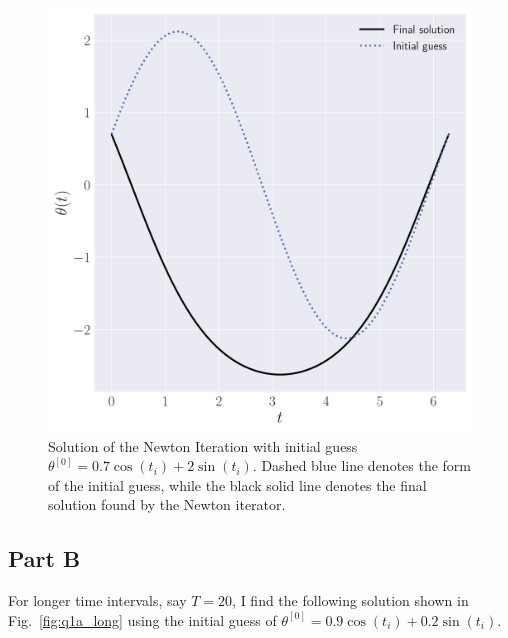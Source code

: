 \documentclass[12pt]{article}
\begin{document}
\begin{figure}[!h]
	\centering
	\includegraphics[clip, scale=0.3]{q1a_alt_guess_figure.pdf}
	\caption{Solution of the Newton Iteration with initial guess $\theta^{[0]}=0.7\cos(t_{i})+2\sin(t_{i})$. Dashed blue line denotes the 
	form of the initial guess, while the black solid line denotes the final solution found by the Newton iterator.}
	\label{fig:q1_alt_guess_plot}
\end{figure}

\subsection*{Part B}
For longer time intervals, say $T = 20$, I find the following solution shown in Fig.~\ref{fig:q1a_long} using the initial guess of $\theta^{[0]}=0.9\cos(t_{i})+0.2\sin(t_{i})$.
\end{document}
